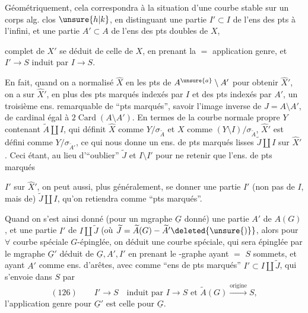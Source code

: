 Géométriquement, cela correspondra à la situation d'une courbe stable
sur un corps alg. clos $\unsure{h|k}$, en distinguant une partie $I'\subset I$
de l'ens des pts à l'infini, et une partie $A'\subset A$ de l'ens des pts doubles de $X$,

complet de $X'$ se déduit de celle de $X$, en prenant la $=$ application genre, et $I'\longrightarrow S$ induit par $I\longrightarrow S$.

En fait, quand on a normalisé $\widehat X$ en les pts de $A^{\unsure{a}}\setminus A'$ pour obtenir $\widehat X'$, on a sur $\widehat X'$, en plus des pts marqués indexés par $I$ et des pts  indexés par $A'$, un troisième ens. remarquable de ``pts marqués'', savoir l'image inverse  de $J=A\setminus A'$,  de cardinal égal à $2\operatorname{Card}(A\setminus A')$. En termes de la courbe normale propre $Y$  contenant $\widetilde A\amalg I$, qui définit $\widehat X$ comme $Y/\sigma_{\widetilde A}$ et $X$ comme $(Y\setminus I)/\sigma_{\widetilde A}$, $\widehat X'$ est défini comme $Y/\sigma_{\widetilde A'}$, ce qui nous donne un ens. de pts marqués lisses  $\widetilde J\amalg I$ sur $\widehat X'$. Ceci étant, au lieu d'``oublier'' $\widetilde J$ et $I\setminus I'$ pour ne retenir que l'ens. de pts marqués

$I'$ sur $\widehat X'$, on peut aussi, plus généralement, se donner une partie $I'$ (non pas de $I$, mais de) $\widetilde J\amalg I$, qu'on retiendra comme ``pts marqués''.

Quand on s'est ainsi donné (pour un mgraphe $\underline G$ donné) une partie $A'$ de $A(G)$, et une partie $I'$ de $I\amalg\widetilde J$ (où $\widetilde J=\widetilde A(G)-\widetilde A'\deleted{\unsure{)}}$, alors pour $\forall$ courbe spéciale $G$-épinglée, on déduit une courbe spéciale, qui sera épinglée par le mgraphe $\underline G'$ déduit de $\underline G,A',I'$ en prenant le -graphe  ayant $=$ $S$ sommets, et ayant $A'$ comme ens. d'arêtes, avec comme ``ens de pts marqués'' $I'\subset I\amalg\widetilde J$, qui s'envoie dans $S$  par
\[
(126)\qquad I'\longrightarrow S\quad\text{induit par }I\longrightarrow S\text{ et }\widetilde A(G)\xrightarrow{\text{origine}}S,
\]
l'application genre pour $\underline G'$ est celle pour $\underline G$.

